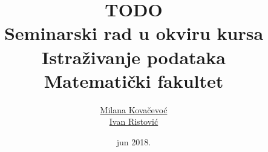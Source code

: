 \documentclass[a4paper]{article}
\begin{document}
\title{TODO\\ \small{Seminarski rad u okviru kursa\\Istra\v{z}ivanje podataka\\ Matematički fakultet}}

\author{\href{mailto:mi14031@matf.bg.ac.rs}{Milana Kova\v{c}evo\'c}\\\href{mailto:mi14042@matf.bg.ac.rs}{Ivan Ristovi\'c}}
\date{jun 2018.}


\maketitle

\tableofcontents

\newpage








\appendix



\end{document}
